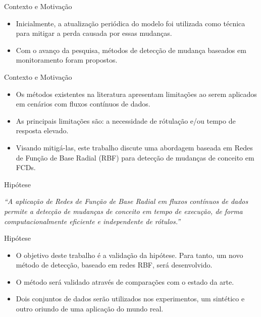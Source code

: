 \documentclass[10pt]{beamer}
\begin{document}
\begin{frame}{Contexto e Motivação}
    \begin{itemize}
        \item<1 -> Inicialmente, a atualização periódica do modelo foi utilizada como técnica para mitigar a perda causada por essas mudanças.
        \item<2 -> Com o avanço da pesquisa, métodos de detecção de mudança baseados em monitoramento foram propostos.
      \end{itemize}
\end{frame}


\begin{frame}{Contexto e Motivação}
    \begin{itemize}
        \item<1 -> Os métodos existentes na literatura apresentam limitações ao serem aplicados em cenários com fluxos contínuos de dados.
        \item<2 -> As principais limitações são: a necessidade de rótulação e/ou tempo de resposta elevado.
        \item<3 -> Visando mitigá-las, este trabalho discute uma abordagem baseada em Redes de Função de Base Radial (RBF) para detecção de mudanças de conceito em FCDs.
      \end{itemize}
\end{frame}


\begin{frame}{Hipótese}

    \begin{center}
        \textit{``A aplicação de Redes de Função de Base Radial em fluxos contínuos de dados permite a detecção de mudanças de conceito em tempo de execução, de forma computacionalmente eficiente e independente de rótulos.''}
    \end{center}

\end{frame}

\begin{frame}{Hipótese}
    \begin{itemize}
        \item<1 -> O objetivo deste trabalho é a validação da hipótese. Para tanto, um novo método de detecção, baseado em redes RBF, será desenvolvido.
        \item<2 -> O método será validado através de comparações com o estado da arte.
        \item<3 -> Dois conjuntos de dados serão utilizados nos experimentos, um sintético e outro oriundo de uma aplicação do mundo real.
      \end{itemize}
\end{frame}
\end{document}
